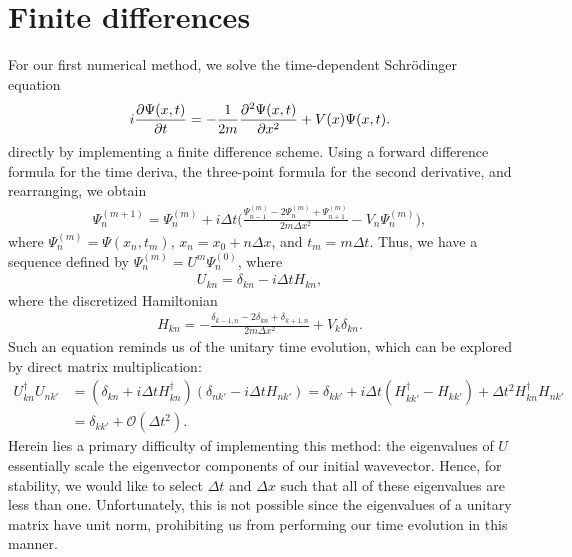 \appendix

\section{Finite differences}
\label{ssec:finite-differences}

For our first numerical method, we solve the time-dependent Schr\"{o}dinger equation 
\begin{align}
    i \pdv{\Psi(x,t)}{t} = -\frac{1}{2m} \pdv[2]{\Psi(x,t)}{x} + V(x) \Psi(x,t)
.\end{align}
directly by implementing a finite difference scheme.
Using a forward difference formula for the time deriva, the three-point formula for the second derivative, and rearranging, we obtain
\begin{align}
    \Psi_{n}^{(m + 1)} = \Psi_{n}^{(m)} + i \Delta t \Bigg( \frac{\Psi_{n-1}^{(m)} - 2 \Psi_{n}^{(m)} + \Psi_{n+1}^{(m)}}{2m \Delta x^2} - V_{n} \Psi_{n}^{(m)} \Bigg)
,\end{align}
where $\Psi_{n}^{(m)} = \Psi(x_n,t_{m})$, $x_{n} = x_0 + n \Delta x$, and $t_{m} = m \Delta t$.
Thus, we have a sequence defined by $\Psi_{n}^{(m)} = U^{m} \Psi_{n}^{(0)}$, where
\begin{align}
    U_{kn} = \delta_{kn} - i \Delta t H_{kn}
,\end{align}
where the discretized Hamiltonian
\begin{align}
    H_{kn} = -\frac{\delta_{k-1,n} - 2 \delta_{kn} + \delta_{k+1,n}}{2m \Delta x^2} + V_{k} \delta_{kn}
.\end{align}
Such an equation reminds us of the unitary time evolution, which can be explored by direct matrix multiplication:
\begin{align}
    U_{kn}^{\dagger} U_{nk'} &= ( \delta_{kn} + i \Delta t H_{kn}^{\dagger} ) ( \delta_{nk'} - i \Delta t H_{nk'} ) = \delta_{k k'} + i \Delta t ( H_{kk'}^{\dagger} - H_{kk'} ) + \Delta t^2 H_{kn}^{\dagger} H_{nk'} \nonumber \\
    &= \delta_{kk'} + \mathcal{O}(\Delta t^2)
.\end{align}
Herein lies a primary difficulty of implementing this method: the eigenvalues of $U$ essentially scale the eigenvector components of our initial wavevector.
Hence, for stability, we would like to select $\Delta t$ and $\Delta x$ such that all of these eigenvalues are less than one.
Unfortunately, this is not possible since the eigenvalues of a unitary matrix have unit norm, prohibiting us from performing our time evolution in this manner.

